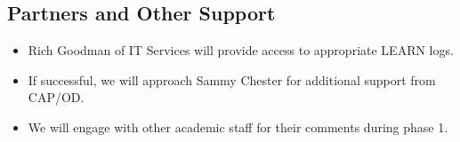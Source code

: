 \documentclass[11pt]{lucs-art}
\begin{document}
\subsection{Partners and Other Support}

\begin{itemize}
\item Rich Goodman of IT Services will provide access to appropriate
  LEARN logs.
\item If successful, we will approach Sammy Chester for additional
  support from CAP/OD.
\item We will engage with other academic staff for their comments
  during phase 1.
\end{itemize}
\end{document}

